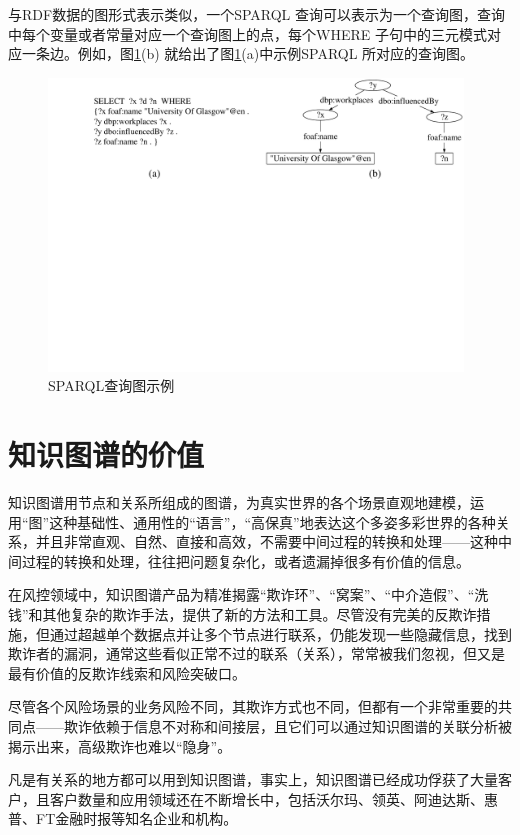 与RDF数据的图形式表示类似，一个SPARQL 查询可以表示为一个查询图\cite{VLDB2011:gStore,VLDBJ:gStore}，查询中每个变量或者常量对应一个查询图上的点，每个WHERE 子句中的三元模式对应一条边。例如，图\ref{fig:SPARQLStatements}(b) 就给出了图\ref{fig:SPARQLStatements}(a)中示例SPARQL 所对应的查询图。


\begin{figure}[h]
\begin{center}
   \includegraphics[width=11cm]{./figures/part1/query_graph.pdf}
    \caption{SPARQL查询图示例}
   \label{fig:SPARQLStatements}
\end{center}
\end{figure}

\section{知识图谱的价值}
知识图谱用节点和关系所组成的图谱，为真实世界的各个场景直观地建模，运用“图”这种基础性、通用性的“语言”，“高保真”地表达这个多姿多彩世界的各种关系，并且非常直观、自然、直接和高效，不需要中间过程的转换和处理——这种中间过程的转换和处理，往往把问题复杂化，或者遗漏掉很多有价值的信息。

在风控领域中，知识图谱产品为精准揭露“欺诈环”、“窝案”、“中介造假”、“洗钱”和其他复杂的欺诈手法，提供了新的方法和工具。尽管没有完美的反欺诈措施，但通过超越单个数据点并让多个节点进行联系，仍能发现一些隐藏信息，找到欺诈者的漏洞，通常这些看似正常不过的联系（关系），常常被我们忽视，但又是最有价值的反欺诈线索和风险突破口。

尽管各个风险场景的业务风险不同，其欺诈方式也不同，但都有一个非常重要的共同点——欺诈依赖于信息不对称和间接层，且它们可以通过知识图谱的关联分析被揭示出来，高级欺诈也难以“隐身”。

凡是有关系的地方都可以用到知识图谱，事实上，知识图谱已经成功俘获了大量客户，且客户数量和应用领域还在不断增长中，包括沃尔玛、领英、阿迪达斯、惠普、FT金融时报等知名企业和机构。

